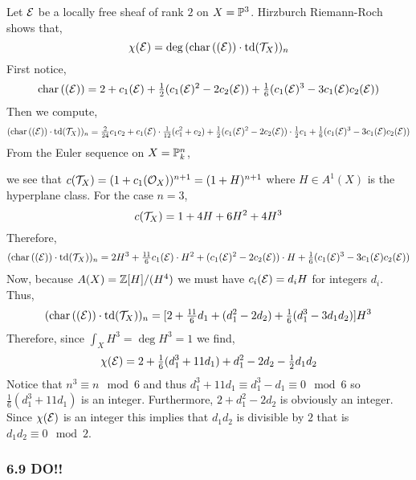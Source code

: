 \documentclass[12pt]{article}
\newcommand{\ch}[1]{\mathrm{char}\left( #1 \right)}
\begin{document}
Let $\E$ be a locally free sheaf of rank $2$ on $X = \P^3$. Hirzburch Riemann-Roch shows that,
\[ \chi(\E) = \deg{(\ch{(\E)} \cdot \td{(\T_X)})_n} \]
First notice,
\[ \ch{(\E)} = 2 + c_1(\E) + \tfrac{1}{2} (c_1(\E)^2 - 2 c_2(\E)) + \tfrac{1}{6} (c_1(\E)^3 - 3 c_1(\E) c_2(\E)) \]
Then we compute,
\begin{align*}
(\ch{(\E)} \cdot \td{(\T_X)})_n = \tfrac{2}{24} c_1 c_2 + c_1(\E) \cdot \tfrac{1}{12}(c_1^2 + c_2) + \tfrac{1}{2} (c_1(\E)^2 - 2 c_2(\E)) \cdot \tfrac{1}{2} c_1 + \tfrac{1}{6} (c_1(\E)^3 - 3 c_1(\E) c_2(\E))
\end{align*}
From the Euler sequence on $X = \P^n_k$,
\begin{center}
\end{center}
we see that $c(\T_X) = (1 + c_1(\struct{X}))^{n+1} = (1 + H)^{n+1}$ where $H \in A^1(X)$ is the hyperplane class. For the case $n = 3$,
\[ c(\T_X) = 1 + 4 H + 6 H^2 + 4 H^3 \]
Therefore,
\[ (\ch{(\E)} \cdot \td{(\T_X)})_n = 2 H^3 + \tfrac{11}{6} c_1(\E) \cdot H^2 + (c_1(\E)^2 - 2 c_2(\E)) \cdot H + \tfrac{1}{6} (c_1(\E)^3 - 3 c_1(\E) c_2(\E)) \]
Now, because $A(X) = \Z[H]/(H^4)$ we must have $c_i(\E) = d_i H$ for integers $d_i$. Thus,
\[ (\ch{(\E)} \cdot \td{(\T_X)})_n = [2 + \tfrac{11}{6} d_1 + (d_1^2 - 2 d_2) + \tfrac{1}{6} (d_1^3 - 3 d_1 d_2)] H^3 \]
Therefore, since $\int_X H^3 = \deg{H^3} = 1$ we find,
\[ \chi(\E) = 2 + \tfrac{1}{6}(d_1^3 + 11 d_1) + d_1^2 - 2 d_2 - \tfrac{1}{2} d_1 d_2 \]
Notice that $n^3 \equiv n \mod 6$ and thus $d_1^3 + 11 d_1 \equiv d_1^3 - d_1 \equiv 0 \mod 6$ so $\tfrac{1}{6} (d_1^3 + 11 d_1)$ is an integer. Furthermore, $2 + d_1^2 - 2 d_2$ is obviously an integer. Since $\chi(\E)$ is an integer this implies that $d_1 d_2$ is divisible by $2$ that is $d_1 d_2 \equiv 0 \mod 2$.

\subsubsection{6.9 DO!!}
\end{document}
